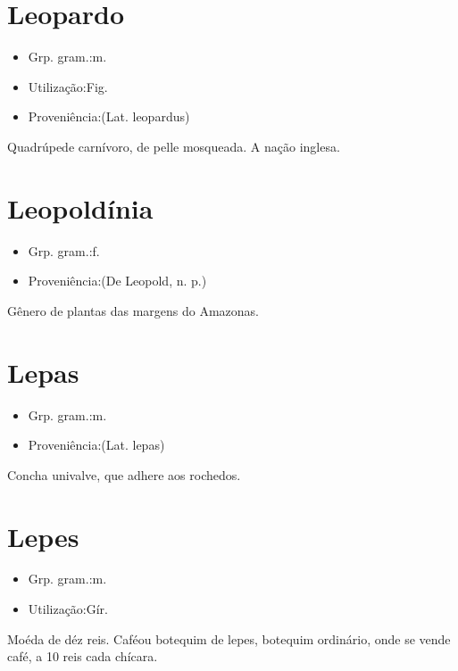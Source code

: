 \section{Leopardo}
\begin{itemize}
\item {Grp. gram.:m.}
\end{itemize}
\begin{itemize}
\item {Utilização:Fig.}
\end{itemize}
\begin{itemize}
\item {Proveniência:(Lat. \textunderscore leopardus\textunderscore )}
\end{itemize}
Quadrúpede carnívoro, de pelle mosqueada.
A nação inglesa.
\section{Leopoldínia}
\begin{itemize}
\item {Grp. gram.:f.}
\end{itemize}
\begin{itemize}
\item {Proveniência:(De \textunderscore Leopold\textunderscore , n. p.)}
\end{itemize}
Gênero de plantas das margens do Amazonas.
\section{Lepas}
\begin{itemize}
\item {Grp. gram.:m.}
\end{itemize}
\begin{itemize}
\item {Proveniência:(Lat. \textunderscore lepas\textunderscore )}
\end{itemize}
Concha univalve, que adhere aos rochedos.
\section{Lepes}
\begin{itemize}
\item {Grp. gram.:m.}
\end{itemize}
\begin{itemize}
\item {Utilização:Gír.}
\end{itemize}
Moéda de déz reis.
\textunderscore Café\textunderscore  ou \textunderscore botequim de lepes\textunderscore , botequim ordinário, onde se vende café, a 10 reis cada chícara.
